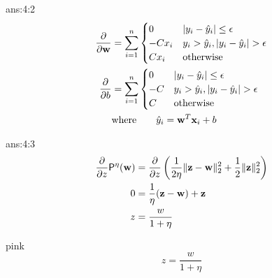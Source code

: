 \documentclass{tron}
\begin{document}
\newpage
\begin{answer}[Gradient]{ans:4:2}
	\begin{align}
		\frac{\partial}{\partial \mathbf{w}} &= \sum_{i=1}^n
			\begin{cases}
				0 	  & |y_i - \hat{y}_i| \leq \epsilon \\
			 	- C x_i & y_i > \hat{y}_i , |y_i - \hat{y}_i| > \epsilon \\
				C x_i 	& \text{otherwise}
			\end{cases}		\\
		\frac{\partial}{\partial b} &= \sum_{i=1}^n
			\begin{cases}
				0 	& |y_i - \hat{y}_i| \leq \epsilon \\
				-C	& y_i > \hat{y}_i , |y_i - \hat{y}_i| > \epsilon \\
				C	& \text{otherwise}
			\end{cases}		\\
		& \text{where}\qquad \hat{y}_i = \mathbf{w}^T \mathbf{x}_i + b
	\end{align}
\end{answer}


\newpage
\begin{answer}{ans:4:3}
	\begin{align}
		\frac{\partial}{\partial z} \mathsf{P}^\eta(\mathbf{w}) & = \frac{\partial}{\partial z} \left(\frac{1}{2\eta} \|\mathbf{z} - \mathbf{w}\|_2^2 + \frac{1}{2} \|\mathbf{z}\|_2^2 \right)\\
		0 & = \frac{1}{\eta} (\mathbf{z} - \mathbf{w}) + \mathbf{z} \\ 
		z & = \frac{w}{1+ \eta}
	\end{align}
	\begin{note}{pink}{}
		\begin{equation}
				z = \frac{w}{1+ \eta}	
		\end{equation}
	\end{note}
\end{answer}
\end{document}
